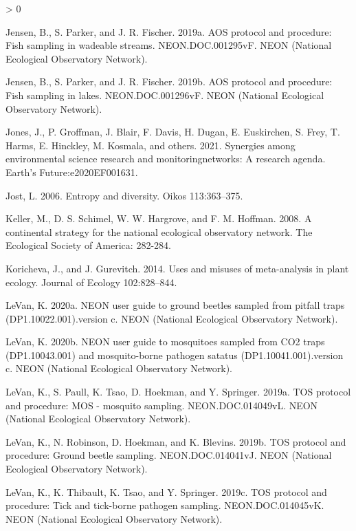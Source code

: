 \documentclass[
  12pt,
]{article}
\newlength{\cslhangindent}
\newenvironment{CSLReferences}[2] %
 {%
  \setlength{\parindent}{0pt}
  \ifodd #1 \everypar{\setlength{\hangindent}{\cslhangindent}}\ignorespaces\fi
  \ifnum #2 > 0
  \setlength{\parskip}{#2\baselineskip}
  \fi
 }%
 {}
\begin{document}
\begin{CSLReferences}{1}{0}
\leavevmode\hypertarget{ref-Jensen2019a}{}%
Jensen, B., S. Parker, and J. R. Fischer. 2019a. AOS protocol and procedure: Fish sampling in wadeable streams. NEON.DOC.001295vF. NEON (National Ecological Observatory Network).

\leavevmode\hypertarget{ref-Jensen2019b}{}%
Jensen, B., S. Parker, and J. R. Fischer. 2019b. AOS protocol and procedure: Fish sampling in lakes. NEON.DOC.001296vF. NEON (National Ecological Observatory Network).

\leavevmode\hypertarget{ref-jones2021synergies}{}%
Jones, J., P. Groffman, J. Blair, F. Davis, H. Dugan, E. Euskirchen, S. Frey, T. Harms, E. Hinckley, M. Kosmala, and others. 2021. Synergies among environmental science research and monitoringnetworks: A research agenda. Earth's Future:e2020EF001631.

\leavevmode\hypertarget{ref-jost2006entropy}{}%
Jost, L. 2006. Entropy and diversity. Oikos 113:363--375.

\leavevmode\hypertarget{ref-keller2008continental}{}%
Keller, M., D. S. Schimel, W. W. Hargrove, and F. M. Hoffman. 2008. A continental strategy for the national ecological observatory network. The Ecological Society of America: 282-284.

\leavevmode\hypertarget{ref-koricheva2014uses}{}%
Koricheva, J., and J. Gurevitch. 2014. Uses and misuses of meta-analysis in plant ecology. Journal of Ecology 102:828--844.

\leavevmode\hypertarget{ref-LeVan2020}{}%
LeVan, K. 2020a. NEON user guide to ground beetles sampled from pitfall traps (DP1.10022.001).version c. NEON (National Ecological Observatory Network).

\leavevmode\hypertarget{ref-LeVan2020b}{}%
LeVan, K. 2020b. NEON user guide to mosquitoes sampled from CO2 traps (DP1.10043.001) and mosquito-borne pathogen satatus (DP1.10041.001).version c. NEON (National Ecological Observatory Network).

\leavevmode\hypertarget{ref-LeVan2019b}{}%
LeVan, K., S. Paull, K. Tsao, D. Hoekman, and Y. Springer. 2019a. TOS protocol and procedure: MOS - mosquito sampling. NEON.DOC.014049vL. NEON (National Ecological Observatory Network).

\leavevmode\hypertarget{ref-LeVan2019}{}%
LeVan, K., N. Robinson, D. Hoekman, and K. Blevins. 2019b. TOS protocol and procedure: Ground beetle sampling. NEON.DOC.014041vJ. NEON (National Ecological Observatory Network).

\leavevmode\hypertarget{ref-LeVan2019c}{}%
LeVan, K., K. Thibault, K. Tsao, and Y. Springer. 2019c. TOS protocol and procedure: Tick and tick-borne pathogen sampling. NEON.DOC.014045vK. NEON (National Ecological Observatory Network).


\end{CSLReferences}
\end{document}
